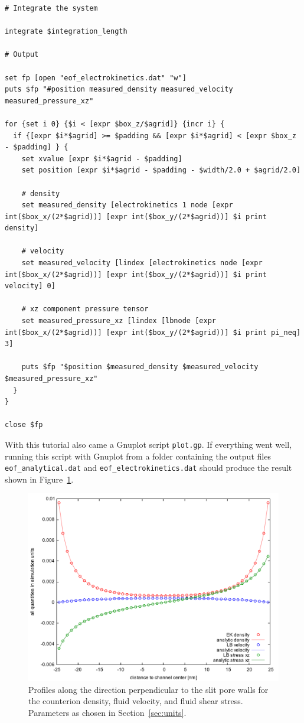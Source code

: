 \begin{lstlisting}[firstnumber=53]
# Integrate the system

integrate $integration_length

# Output

set fp [open "eof_electrokinetics.dat" "w"]
puts $fp "#position measured_density measured_velocity measured_pressure_xz"

for {set i 0} {$i < [expr $box_z/$agrid]} {incr i} {
  if {[expr $i*$agrid] >= $padding && [expr $i*$agrid] < [expr $box_z - $padding] } {
    set xvalue [expr $i*$agrid - $padding]
    set position [expr $i*$agrid - $padding - $width/2.0 + $agrid/2.0]

    # density
    set measured_density [electrokinetics 1 node [expr int($box_x/(2*$agrid))] [expr int($box_y/(2*$agrid))] $i print density]

    # velocity
    set measured_velocity [lindex [electrokinetics node [expr int($box_x/(2*$agrid))] [expr int($box_y/(2*$agrid))] $i print velocity] 0]

    # xz component pressure tensor
    set measured_pressure_xz [lindex [lbnode [expr int($box_x/(2*$agrid))] [expr int($box_y/(2*$agrid))] $i print pi_neq] 3]

    puts $fp "$position $measured_density $measured_velocity $measured_pressure_xz"
  }
}

close $fp
\end{lstlisting}

With this tutorial also came a Gnuplot script \texttt{plot.gp}. If everything went well, running this script with Gnuplot from a folder containing the output files \texttt{eof\_analytical.dat} and \texttt{eof\_electrokinetics.dat} should produce the result shown in Figure~\ref{fig:result}.

\begin{figure}[h]
  \begin{center}
  \includegraphics[width=1.0\columnwidth]{figures/profiles.pdf}
  \end{center}
  \caption{\label{fig:result}Profiles along the direction perpendicular to the slit pore walls for the counterion density, fluid velocity, and fluid shear stress. Parameters as chosen in Section~\ref{sec:units}.}
\end{figure}
